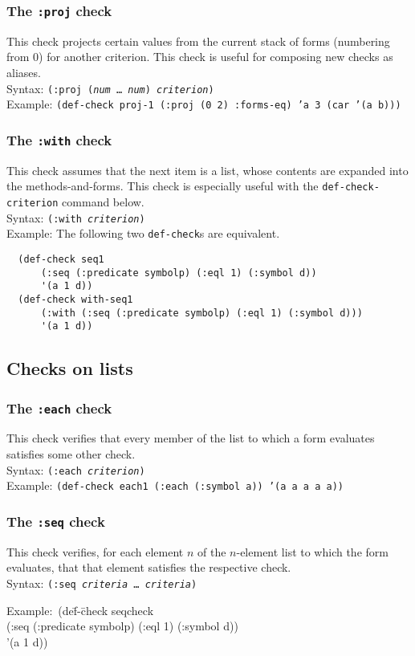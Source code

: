 \subsubsection{The \texttt{:proj} check}
This check projects certain values from the current stack of forms
(numbering from 0) for another criterion.  This check is useful for
composing new checks as aliases.
\\ Syntax: \texttt{(:proj (\textit{num} \ldots\  \textit{num}) \textit{criterion})}
\\ Example: \texttt{(def-check proj-1 (:proj (0 2) :forms-eq) 'a 3 (car '(a b)))}

\subsubsection{The \texttt{:with} check}
\par
This check assumes that the next item is a list, whose contents are
expanded into the methods-and-forms. This
check is especially useful with the \texttt{def-check-cri\-ter\-ion}
command below.
\\ Syntax: \texttt{(:with \emph{criterion})}
\\ Example: The following two \texttt{def-check}s are equivalent.
\begin{verbatim}
  (def-check seq1
      (:seq (:predicate symbolp) (:eql 1) (:symbol d))
      '(a 1 d))
  (def-check with-seq1
      (:with (:seq (:predicate symbolp) (:eql 1) (:symbol d)))
      '(a 1 d))
\end{verbatim}

\subsection{Checks on lists}

\subsubsection{The \texttt{:each} check}
This check verifies that every member of the list to which a form
evaluates satisfies some other check.
\\ Syntax: \texttt{(:each \emph{criterion})}
\\ Example: \texttt{(def-check each1 (:each (:symbol a)) '(a a a a a))}

\subsubsection{The \texttt{:seq} check}
This check verifies, for each element $n$ of the $n$-element list to
which the form evaluates, that that element satisfies the respective
check.
\\ Syntax: \texttt{(:seq \emph{criteria} \ldots\ \emph{criteria})}
{\ttfamily\begin{tabbing}
\textrm{Example:}\ (de\=f-\=check seqcheck
\\ \>\>  (:seq (:predicate symbolp) (:eql 1) (:symbol d))
\\ \>  '(a 1 d))
\end{tabbing}}

